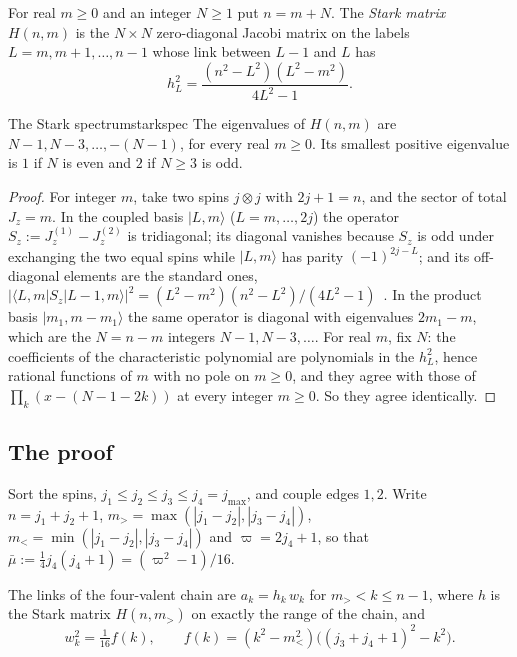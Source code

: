 \begin{definition}\label{def:stark}
For real $m\ge0$ and an integer $N\ge1$ put $n=m+N$. The \emph{Stark matrix}
$H(n,m)$ is the $N\times N$ zero-diagonal Jacobi matrix on the labels
$L=m,m+1,\dots,n-1$ whose link between $L-1$ and $L$ has
\begin{equation}\label{eq:stark}
  h_L^2=\frac{(n^2-L^2)(L^2-m^2)}{4L^2-1}.
\end{equation}
\end{definition}

\begin{boxedlemma}{The Stark spectrum}{starkspec}
The eigenvalues of $H(n,m)$ are $N-1,N-3,\dots,-(N-1)$, for every real $m\ge0$.
Its smallest positive eigenvalue is $1$ if $N$ is even and $2$ if $N\ge3$ is odd.
\end{boxedlemma}

\begin{proof}
For integer $m$, take two spins $j\otimes j$ with $2j+1=n$, and the sector of total
$J_z=m$. In the coupled basis $|L,m\rangle$ ($L=m,\dots,2j$) the operator
$S_z:=J_z^{(1)}-J_z^{(2)}$ is tridiagonal; its diagonal vanishes because $S_z$ is odd
under exchanging the two equal spins while $|L,m\rangle$ has parity $(-1)^{2j-L}$;
and its off-diagonal elements are the standard ones,
$|\langle L,m|S_z|L-1,m\rangle|^2=(L^2-m^2)(n^2-L^2)/(4L^2-1)$~\cite{Edmonds}. In
the product basis $|m_1,m-m_1\rangle$ the same operator is diagonal with eigenvalues
$2m_1-m$, which are the $N=n-m$ integers $N-1,N-3,\dots$. For real $m$, fix $N$:
the coefficients of the characteristic polynomial are polynomials in the $h_L^2$,
hence rational functions of $m$ with no pole on $m\ge0$, and they agree with those
of $\prod_k(x-(N-1-2k))$ at every integer $m\ge0$. So they agree identically.
\end{proof}

\subsection{The proof}

Sort the spins, $j_1\le j_2\le j_3\le j_4=j_{\max}$, and couple edges $1,2$. Write
$n=j_1+j_2+1$, $m_>=\max(|j_1-j_2|,|j_3-j_4|)$, $m_<=\min(|j_1-j_2|,|j_3-j_4|)$ and
$\varpi=2j_4+1$, so that $\bar\mu:=\frac14j_4(j_4+1)=(\varpi^2-1)/16$.

\begin{lemma}[Factorisation]\label{lem:fact}
The links of the four-valent chain are $a_k=h_k\,w_k$ for $m_><k\le n-1$, where $h$
is the Stark matrix $H(n,m_>)$ on exactly the range of the chain, and
\[
  w_k^2=\tfrac1{16}f(k),\qquad f(k)=(k^2-m_<^2)\bigl((j_3+j_4+1)^2-k^2\bigr).
\]
\end{lemma}

